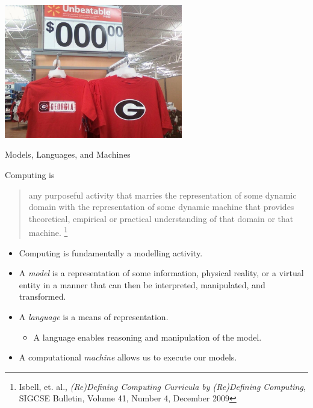 \documentclass{beamer}
\begin{document}
\begin{frame}
  \titlepage
\vspace{-1.3in}
\begin{center}
\includegraphics[height=2.3in]{value-uga-shirt.jpg}
\end{center}
\end{frame}

\begin{frame}[fragile]{Models, Languages, and Machines}

Computing is

\begin{quote}
any purposeful activity that marries the representation of some dynamic domain with the representation of some dynamic machine that provides theoretical, empirical or practical understanding of that domain or that machine.
\footnote{Isbell, et. al., {\it (Re)Defining Computing Curricula by (Re)Defining Computing}, SIGCSE Bulletin, Volume 41, Number 4, December 2009}
\end{quote}

\begin{itemize}
\item Computing is fundamentally a modelling activity.
\item A {\it model} is a representation of some information, physical reality, or a virtual entity in a manner that can then be interpreted, manipulated, and transformed.
\item A {\it language} is a means of representation.
\begin{itemize}
  \item A language enables reasoning and manipulation of the model.
\end{itemize}
\item A computational {\it machine} allows us to execute our models.
\end{itemize}

\end{frame}
\end{document}
